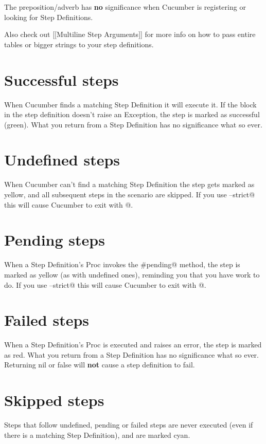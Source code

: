 The preposition/adverb has \textbf{no} significance when Cucumber is registering or looking for Step Definitions.

Also check out [[Multiline Step Arguments]] for more info on how to pass entire tables or bigger strings to your step definitions.

\section{Successful steps}

When Cucumber finds a matching Step Definition it will execute it. If the block in the step definition doesn't raise an Exception, the step is marked as successful (green). What you return from a Step Definition has no significance what so ever.

\section{Undefined steps}

When Cucumber can't find a matching Step Definition the step gets marked as yellow, and all subsequent steps in the scenario are skipped. If you use \verb@--strict@ this will cause Cucumber to exit with @.

\section{Pending steps}

When a Step Definition's Proc invokes the \verb@#pending@ method, the step is marked as yellow (as with undefined ones), reminding you that you have work to do. If you use \verb@--strict@ this will cause Cucumber to exit with @.

\section{Failed steps}

When a Step Definition's Proc is executed and raises an error, the step is marked as red. What you return from a Step Definition has no significance what so ever. Returning nil or false will \textbf{not} cause a step definition to fail.

\section{Skipped steps}

Steps that follow undefined, pending or failed steps are never executed (even if there is a matching Step Definition), and are marked cyan.

